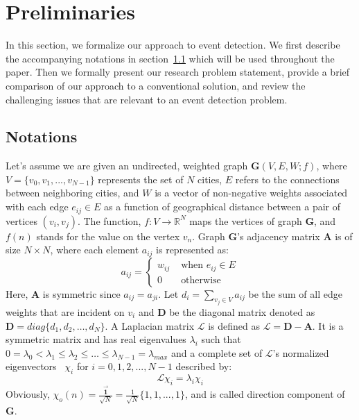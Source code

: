 \section{Preliminaries} \label{sec:preliminaries}
In this section, we formalize our approach to event detection.
We first describe the accompanying notations in section~\ref{sec:notations} which will be used throughout the paper.
Then we formally present our research problem statement, provide a brief comparison of our approach to a conventional solution, and review the challenging issues that are relevant to an event detection problem.
\subsection{Notations}
\label{sec:notations}
Let's assume we are given an undirected, weighted graph $\mathbf{G}(V,E,W;f)$, where $V=\{v_0,v_1,...,v_{N-1}\}$ represents the set of $N$ cities, $E$ refers to the connections between neighboring cities, and $W$ is a vector of non-negative weights associated with each edge $e_{ij}\in E$ as a function of geographical distance between a pair of vertices $(v_{i}, v_{j})$. The function, $f: V \rightarrow {\mathbb{R}}^N$ maps the vertices of graph $\mathbf{G}$, and $f(n)$ stands for the value on the vertex $v_n$. Graph $\mathbf{G}$'s adjacency matrix $\mathbf{A}$ is of size $N\times N$, where each element $a_{ij}$ is represented as:
\begin{equation}
a_{ij} = \left\{ \begin{array}{rl}
 w_{ij} &\mbox{ when $e_{ij}\in {E}$} \\
  0 &\mbox{ otherwise}
       \end{array} \right.
\end{equation}
Here, $\mathbf{A}$ is symmetric since $a_{ij}=a_{ji}$.
Let $d_i=\sum\limits_{v_j \in V}a_{ij}$ be the sum of all edge weights that are incident on $v_i$ and $\mathbf{D}$ be the diagonal matrix denoted as $\mathbf{D}=diag\{d_1,d_2,\ldots,d_N\}$. A Laplacian matrix $\mathcal{L}$ is defined as $\mathcal{L}=\mathbf{D-A}$. It is a symmetric matrix and has real eigenvalues $\lambda_{i}$ such that $0 = \lambda_{0} < \lambda_{1} \leq \lambda_{2} \leq \ldots \leq \lambda_{N-1} = \lambda_{max}$ and a complete set of $\mathcal{L}$'s normalized eigenvectors~\cite{bapat2010graphs} $\chi_{i}$ for $i=0,1,2,...,N-1$ described by:
\begin{equation}
\label{eq:eigenvalues}
\mathcal{L}\chi_{i}=\lambda_{i}\chi_{i}
\end{equation}
Obviously, $\chi_o(n)=\frac{\vec{\textbf{1}}}{\sqrt{N}}=\frac{1}{\sqrt{N}}\{1,1,...,1\}$, and is called direction component of $\mathbf{G}$.

